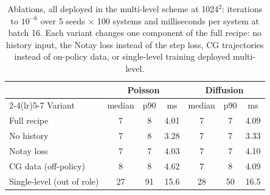 \begin{table}[t]
\centering
\footnotesize
\setlength{\tabcolsep}{3pt}
\caption{Ablations, all deployed in the multi-level scheme at 1024$^2$: iterations to $10^{-6}$ over 5 seeds $\times$ 100 systems and milliseconds per system at batch 16. Each variant changes one component of the full recipe: no history input, the Notay loss instead of the step loss, CG trajectories instead of on-policy data, or single-level training deployed multi-level.}
\label{tab:ablations}
\begin{tabular}{lcccccc}
\toprule
& \multicolumn{3}{c}{Poisson} & \multicolumn{3}{c}{Diffusion} \\
\cmidrule(lr){2-4}\cmidrule(lr){5-7}
Variant & median & p90 & ms & median & p90 & ms \\
\midrule
Full recipe & 7 & 8 & 4.01 & 7 & 7 & 4.09 \\
No history & 7 & 8 & 3.28 & 7 & 7 & 3.33 \\
Notay loss & 7 & 7 & 4.03 & 7 & 7 & 4.10 \\
CG data (off-policy) & 8 & 8 & 4.62 & 7 & 8 & 4.09 \\
Single-level (out of role) & 27 & 91 & 15.6 & 28 & 50 & 16.5 \\
\bottomrule
\end{tabular}
\end{table}
